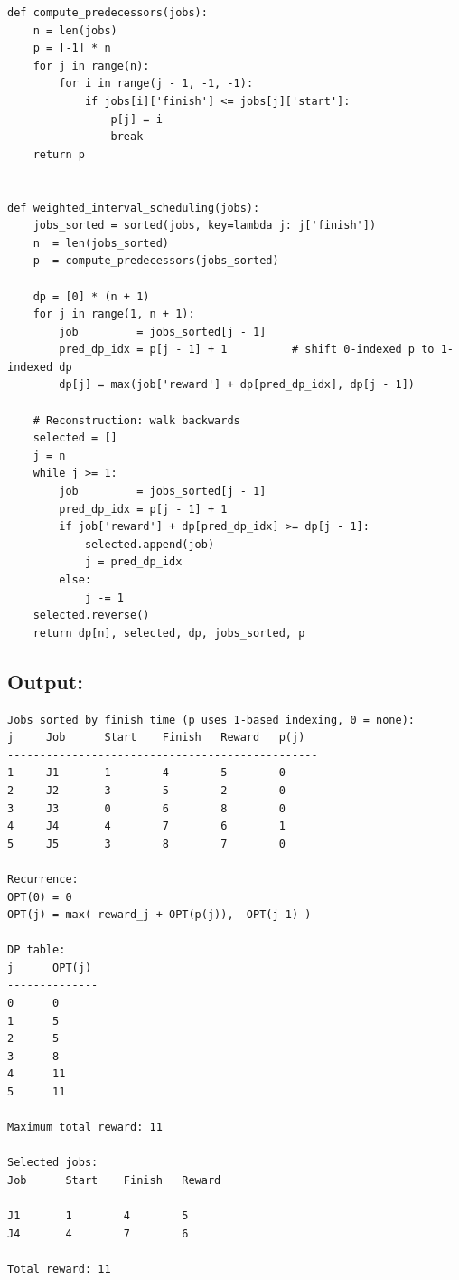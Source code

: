 \documentclass[11pt,a4paper]{article}
\begin{document}
\begin{lstlisting}[style=python, caption={Predecessor computation and DP (src/d2\_weighted\_dp.py).}]
def compute_predecessors(jobs):
    n = len(jobs)
    p = [-1] * n
    for j in range(n):
        for i in range(j - 1, -1, -1):
            if jobs[i]['finish'] <= jobs[j]['start']:
                p[j] = i
                break
    return p


def weighted_interval_scheduling(jobs):
    jobs_sorted = sorted(jobs, key=lambda j: j['finish'])
    n  = len(jobs_sorted)
    p  = compute_predecessors(jobs_sorted)

    dp = [0] * (n + 1)
    for j in range(1, n + 1):
        job         = jobs_sorted[j - 1]
        pred_dp_idx = p[j - 1] + 1          # shift 0-indexed p to 1-indexed dp
        dp[j] = max(job['reward'] + dp[pred_dp_idx], dp[j - 1])

    # Reconstruction: walk backwards
    selected = []
    j = n
    while j >= 1:
        job         = jobs_sorted[j - 1]
        pred_dp_idx = p[j - 1] + 1
        if job['reward'] + dp[pred_dp_idx] >= dp[j - 1]:
            selected.append(job)
            j = pred_dp_idx
        else:
            j -= 1
    selected.reverse()
    return dp[n], selected, dp, jobs_sorted, p
\end{lstlisting}

\subsection{Output:}
\begin{lstlisting}[style=output]
Jobs sorted by finish time (p uses 1-based indexing, 0 = none):
j     Job      Start    Finish   Reward   p(j)
------------------------------------------------
1     J1       1        4        5        0
2     J2       3        5        2        0
3     J3       0        6        8        0
4     J4       4        7        6        1
5     J5       3        8        7        0

Recurrence:
OPT(0) = 0
OPT(j) = max( reward_j + OPT(p(j)),  OPT(j-1) )

DP table:
j      OPT(j)
--------------
0      0
1      5
2      5
3      8
4      11
5      11

Maximum total reward: 11

Selected jobs:
Job      Start    Finish   Reward
------------------------------------
J1       1        4        5
J4       4        7        6

Total reward: 11
\end{lstlisting}
\end{document}
